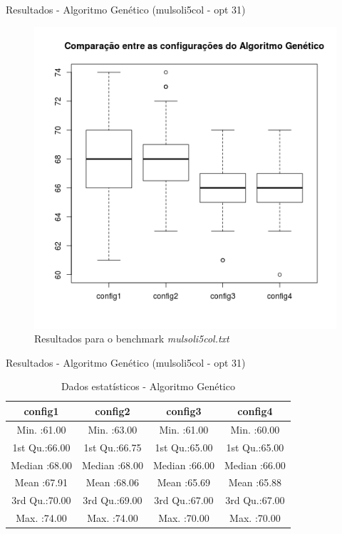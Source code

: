 \documentclass[compress, hide notes]{beamer}
\begin{document}
        
        
        \begin{frame}{Resultados - Algoritmo Genético (mulsoli5col - opt 31)}
        
        	\begin{figure}[H]
			\centering
            \label{fig:sol-ga-mulsoli5col}
            \includegraphics[width=0.6\linewidth]{img/ga-sol-mulsoli5col.png}
            \caption[Resultados para o benchmark mulsoli5col.txt]{Resultados para o benchmark \textit{mulsoli5col.txt}}
			\end{figure}

		\end{frame}
        
        
        \begin{frame}{Resultados - Algoritmo Genético (mulsoli5col - opt 31)}
        
        	\begin{table}[H]
            \centering
              \begin{tabular}{c|c|c|c}
               \textbf{config1}       &  \textbf{config2}               &  \textbf{config3}                &  \textbf{config4}                         \\ \hline \hline
               Min.   :61.00 &          Min.   :63.00 &           Min.   :61.00 &           Min.   :60.00          \\ \hline
               1st Qu.:66.00 &          1st Qu.:66.75 &           1st Qu.:65.00 &           1st Qu.:65.00          \\ \hline
               Median :68.00 &          Median :68.00 &           Median :66.00 &           Median :66.00          \\ \hline
               Mean   :67.91 &          Mean   :68.06 &           Mean   :65.69 &           Mean   :65.88          \\ \hline
               3rd Qu.:70.00 &          3rd Qu.:69.00 &           3rd Qu.:67.00 &           3rd Qu.:67.00          \\ \hline
               Max.   :74.00 &          Max.   :74.00 &          Max.   :70.00  &           Max.   :70.00          \\ 
              \end{tabular}
              \caption {Dados estatísticos - Algoritmo Genético}
        	\end{table}

		\end{frame}
        
\end{document}
